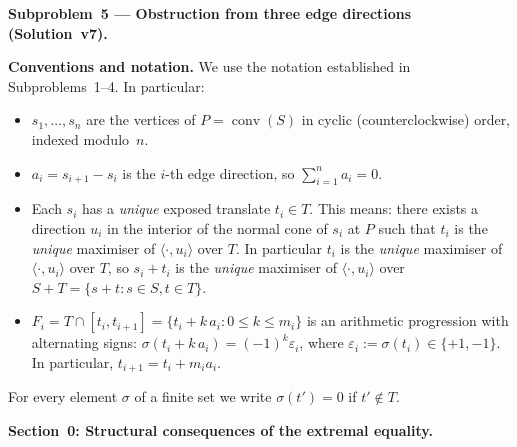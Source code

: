\documentclass{article}
\begin{document}
\textbf{Subproblem~5 --- Obstruction from three edge directions (Solution~v7).}

\medskip
\noindent\textbf{Conventions and notation.}
We use the notation established in Subproblems~1--4.
In particular:
\begin{itemize}
  \item $s_1,\dots,s_n$ are the vertices of $P=\operatorname{conv}(S)$ in cyclic
        (counterclockwise) order, indexed modulo~$n$.
  \item $a_i = s_{i+1}-s_i$ is the $i$-th edge direction, so $\sum_{i=1}^n a_i = 0$.
  \item Each $s_i$ has a \emph{unique} exposed translate $t_i\in T$.  This means:
        there exists a direction $u_i$ in the interior of the normal cone of $s_i$ at $P$
        such that $t_i$ is the \emph{unique} maximiser of $\langle\cdot,u_i\rangle$ over $T$.
        In particular $t_i$ is the \emph{unique} maximiser of $\langle\cdot,u_i\rangle$ over
        $T$, so $s_i+t_i$ is the \emph{unique} maximiser of $\langle\cdot,u_i\rangle$ over
        $S+T=\{s+t:s\in S,t\in T\}$.
  \item $F_i = T\cap[t_i,t_{i+1}]=\{t_i+k\,a_i:0\le k\le m_i\}$ is an arithmetic
        progression with alternating signs: $\sigma(t_i+k\,a_i)=(-1)^k\varepsilon_i$,
        where $\varepsilon_i:=\sigma(t_i)\in\{+1,-1\}$.  In particular,
        $t_{i+1}=t_i+m_i a_i$.
\end{itemize}

For every element $\sigma$ of a finite set we write $\sigma(t')=0$ if $t'\notin T$.

\medskip
\noindent\textbf{Section~0: Structural consequences of the extremal equality.}
\end{document}
